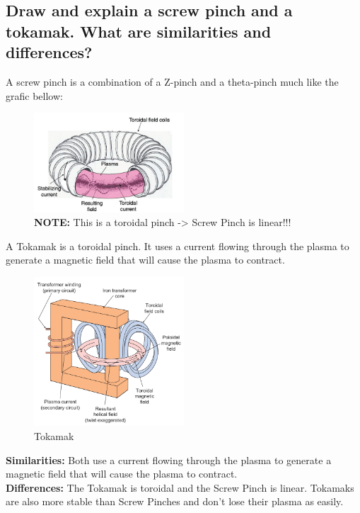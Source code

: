 \subsection{Draw and explain a screw pinch and a tokamak. What are similarities and differences?}
\begin{multisolutionblock}
A screw pinch is a combination of a Z-pinch and a theta-pinch much like the grafic bellow: 

\begin{figure}[H]
    \centering
    \includegraphics[width=0.5\textwidth]{chapters/fig/5_screw_pinch.png}
    \caption{\textbf{NOTE:} This is a toroidal pinch -> Screw Pinch is linear!!!}
    \label{fig:screw_pinch}
\end{figure}
A Tokamak is a toroidal pinch. It uses a current flowing through the plasma to generate a magnetic field that will cause the plasma to contract. 
\begin{figure}[H]
    \centering
    \includegraphics[width=0.5\textwidth]{chapters/fig/5_tokamak.png}
    \caption{Tokamak}
    \label{fig:tokamak}
\end{figure}
\textbf{Similarities:} Both use a current flowing through the plasma to generate a magnetic field that will cause the plasma to contract. \\
\textbf{Differences:} The Tokamak is toroidal and the Screw Pinch is linear. Tokamaks are also more stable than Screw Pinches and don't lose their plasma as easily.
\end{multisolutionblock}


